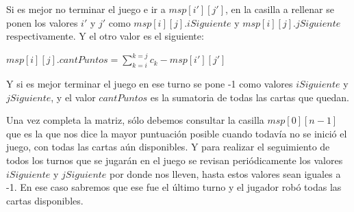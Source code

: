 Si es mejor no terminar el juego e ir a $msp[i'][j']$,  en la casilla a rellenar se ponen los valores $i'$ y $j'$ como $msp[i][j].iSiguiente$ y $msp[i][j].jSiguiente$ respectivamente. Y el otro valor es el siguiente:

$msp[i][j].cantPuntos = \sum_{k=i}^{k=j} c_k - msp[i'][j']$

Y si es mejor terminar el juego en ese turno se pone -1 como valores $iSiguiente$ y $jSiguiente$, y el valor $cantPuntos$ es la sumatoria de todas las cartas que quedan.

Una vez completa la matriz, sólo debemos consultar la casilla $msp[0][n-1]$ que es la que nos dice la mayor puntuación posible cuando todavía no se inició el juego, con todas las cartas aún disponibles. Y para realizar el seguimiento de todos los turnos que se jugarán en el juego se revisan periódicamente los valores $iSiguiente$ y $jSiguiente$ por donde nos lleven, hasta estos valores sean iguales a -1. En ese caso sabremos que ese fue el último turno y el jugador robó todas las cartas disponibles.